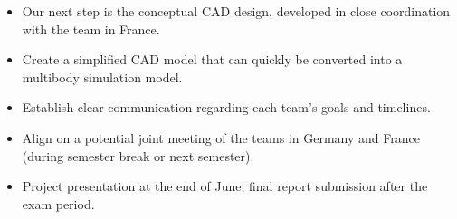 \begin{itemize}
		\item Our next step is the conceptual CAD design, developed in close coordination with the team in France.
		
		\item Create a simplified CAD model that can quickly be converted into a multibody simulation model.
		
		\item Establish clear communication regarding each team's goals and timelines.
		
		\item Align on a potential joint meeting of the teams in Germany and France (during semester break or next semester).
		
		\item Project presentation at the end of June; final report submission after the exam period.
	\end{itemize}
